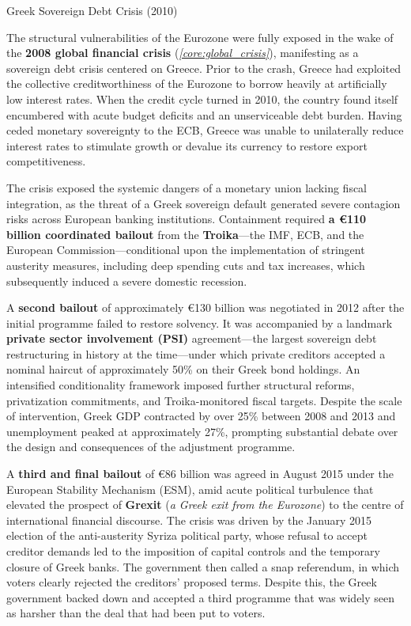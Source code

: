 \documentclass[10pt]{article}
\begin{document}
    \begin{core}[label=core:euro_debt]{Greek Sovereign Debt Crisis (2010)}

      The structural vulnerabilities of the Eurozone were fully exposed in the wake of the \textbf{2008 global financial crisis} (\textit{\autoref{core:global_crisis}}), manifesting as a sovereign debt crisis centered on Greece. Prior to the crash, Greece had exploited the collective creditworthiness of the Eurozone to borrow heavily at artificially low interest rates. When the credit cycle turned in 2010, the country found itself encumbered with acute budget deficits and an unserviceable debt burden. Having ceded monetary sovereignty to the ECB, Greece was unable to unilaterally reduce interest rates to stimulate growth or devalue its currency to restore export competitiveness.


      The crisis exposed the systemic dangers of a monetary union lacking fiscal integration, as the threat of a Greek sovereign default generated severe contagion risks across European banking institutions. Containment required \textbf{a \euro110 billion coordinated bailout} from the \textbf{Troika}---the IMF, ECB, and the European Commission---conditional upon the implementation of stringent austerity measures, including deep spending cuts and tax increases, which subsequently induced a severe domestic recession.

      A \textbf{second bailout} of approximately \euro130 billion was negotiated in 2012 after the initial programme failed to restore solvency. It was accompanied by a landmark \textbf{private sector involvement (PSI)} agreement---the largest sovereign debt restructuring in history at the time---under which private creditors accepted a nominal haircut of approximately 50\% on their Greek bond holdings. An intensified conditionality framework imposed further structural reforms, privatization commitments, and Troika-monitored fiscal targets. Despite the scale of intervention, Greek GDP contracted by over 25\% between 2008 and 2013 and unemployment peaked at approximately 27\%, prompting substantial debate over the design and consequences of the adjustment programme.

      A \textbf{third and final bailout} of \euro86 billion was agreed in August 2015 under the European Stability Mechanism (ESM), amid acute political turbulence that elevated the prospect of \textbf{Grexit} (\textit{a Greek exit from the Eurozone}) to the centre of international financial discourse. The crisis was driven by the January 2015 election of the anti-austerity Syriza political party, whose refusal to accept creditor demands led to the imposition of capital controls and the temporary closure of Greek banks. The government then called a snap referendum, in which voters clearly rejected the creditors' proposed terms. Despite this, the Greek government backed down and accepted a third programme that was widely seen as harsher than the deal that had been put to voters.


\end{core}
\end{document}

